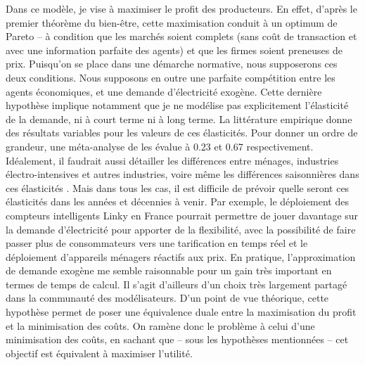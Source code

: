 Dans ce modèle, je vise à maximiser le profit des producteurs. En effet, d’après le premier théorème du bien-être, cette maximisation conduit à un optimum de Pareto – à condition que les marchés soient complets (sans coût de transaction et avec une information parfaite des agents) et que les firmes soient preneuses de prix. Puisqu’on se place dans une démarche normative, nous supposerons ces deux conditions. 
Nous supposons en outre une parfaite compétition entre les agents économiques, et une demande d’électricité exogène. Cette dernière hypothèse implique notamment que je ne modélise pas explicitement l'élasticité de la demande, ni à court terme ni à long terme. La littérature empirique donne des résultats variables pour les valeurs de ces élasticités. Pour donner un ordre de grandeur, une méta-analyse de \citet{Labandeira2016} les évalue à 0.23 et 0.67 respectivement. Idéalement, il faudrait aussi détailler les différences entre ménages, industries électro-intensives et autres industries, voire même les différences saisonnières dans ces élasticités \citep{Fan2011}. Mais dans tous les cas, il est difficile de prévoir quelle seront ces élasticités dans les années et décennies à venir. Par exemple, le déploiement des compteurs intelligents Linky en France pourrait permettre de jouer davantage sur la demande d'électricité pour apporter de la flexibilité, avec la possibilité de faire passer plus de consommateurs vers une tarification en temps réel et le déploiement d'appareils ménagers réactifs aux prix.
En pratique, l'approximation de demande exogène me semble raisonnable pour un gain très important en termes de temps de calcul. Il s'agit d'ailleurs d'un choix très largement partagé dans la communauté des modélisateurs. D’un point de vue théorique, cette hypothèse permet de poser une équivalence duale entre la maximisation du profit et la minimisation des coûts. 
On ramène donc le problème à celui d’une minimisation des coûts, en sachant que – sous les hypothèses mentionnées – cet objectif est équivalent à maximiser l’utilité.

